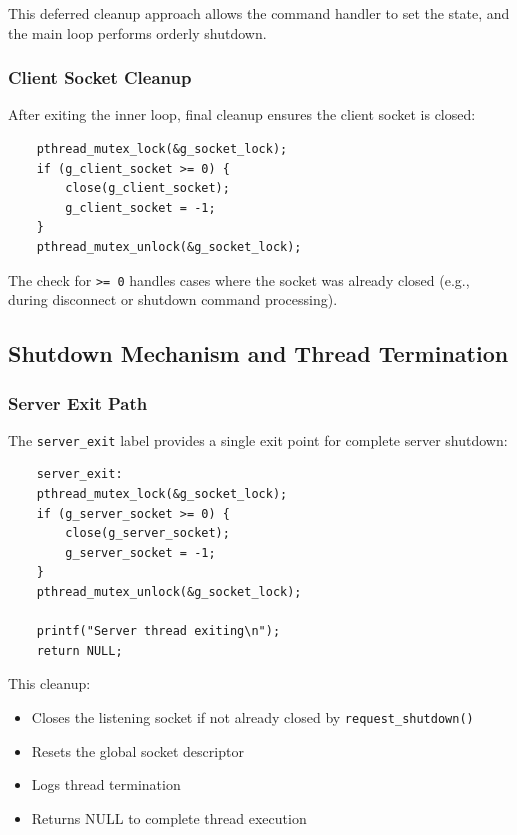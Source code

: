 This deferred cleanup approach allows the command handler to set the state, and the main loop performs orderly shutdown.

\subsubsection{Client Socket Cleanup}

After exiting the inner loop, final cleanup ensures the client socket is closed:

\begin{verbatim}
	pthread_mutex_lock(&g_socket_lock);
	if (g_client_socket >= 0) {
		close(g_client_socket);
		g_client_socket = -1;
	}
	pthread_mutex_unlock(&g_socket_lock);
\end{verbatim}

The check for \texttt{>= 0} handles cases where the socket was already closed (e.g., during disconnect or shutdown command processing).

\subsection{Shutdown Mechanism and Thread Termination}

\subsubsection{Server Exit Path}

The \texttt{server\_exit} label provides a single exit point for complete server shutdown:

\begin{verbatim}
	server_exit:
	pthread_mutex_lock(&g_socket_lock);
	if (g_server_socket >= 0) {
		close(g_server_socket);
		g_server_socket = -1;
	}
	pthread_mutex_unlock(&g_socket_lock);
	
	printf("Server thread exiting\n");
	return NULL;
\end{verbatim}

This cleanup:
\begin{itemize}
	\item Closes the listening socket if not already closed by \texttt{request\_shutdown()}
	\item Resets the global socket descriptor
	\item Logs thread termination
	\item Returns NULL to complete thread execution
\end{itemize}


